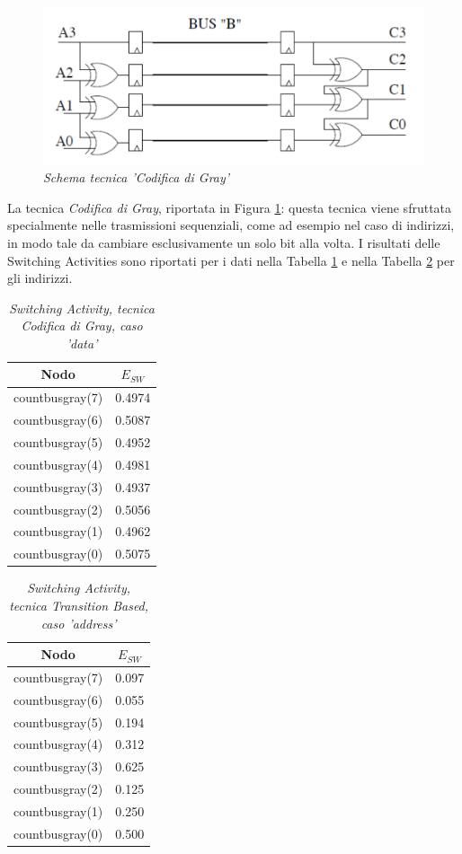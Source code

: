 \begin{figure}[!htb]
	\centering
	\includegraphics[scale=1]{immagini/gray}
	\caption{\textit{Schema tecnica 'Codifica di Gray'}}
	\label{gray}
\end{figure}
\newpage
\noindent La tecnica \textit{Codifica di Gray}, riportata in Figura \ref{gray}: questa tecnica viene sfruttata specialmente nelle trasmissioni sequenziali, come ad esempio nel caso di indirizzi, in modo tale da cambiare esclusivamente un solo bit alla volta. I risultati delle Switching Activities sono riportati per i dati nella Tabella \ref{Tab7} e nella Tabella \ref{Tab8} per gli indirizzi. \\
\begin{table}[!h]\footnotesize
	\centering
	\begin{tabular}{|c|c|}
		\hline
		\textbf{Nodo} & \textbf{$E_{SW}$}\\
		\hline
		countbusgray(7) & 0.4974\\
		countbusgray(6) & 0.5087\\
		countbusgray(5) & 0.4952\\
		countbusgray(4) & 0.4981\\
		countbusgray(3) & 0.4937\\
		countbusgray(2) & 0.5056\\
		countbusgray(1) & 0.4962\\
		countbusgray(0) & 0.5075\\
		\hline
	\end{tabular}
	\caption{\textit{Switching Activity, tecnica Codifica di Gray, caso 'data'}}
	\label{Tab7}
\end{table}
\begin{table}[!h]\footnotesize
	\centering
	\begin{tabular}{|c|c|}
		\hline
		\textbf{Nodo} & \textbf{$E_{SW}$}\\
		\hline
		countbusgray(7) & 0.097\\
		countbusgray(6) & 0.055\\
		countbusgray(5) & 0.194\\
		countbusgray(4) & 0.312\\
		countbusgray(3) & 0.625\\
		countbusgray(2) & 0.125\\
		countbusgray(1) & 0.250\\
		countbusgray(0) & 0.500\\
		\hline
	\end{tabular}
	\caption{\textit{Switching Activity, tecnica Transition Based, caso 'address'}}
	\label{Tab8}
\end{table}
